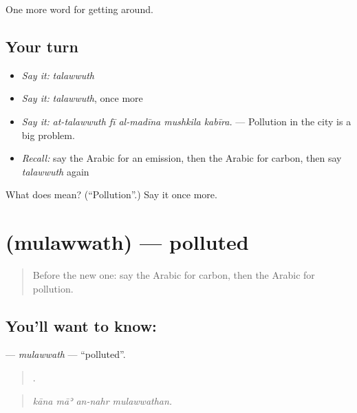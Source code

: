 \begin{grammarlens}[title={What you've built}]
One more word for getting around.
\end{grammarlens}

\subsection*{Your turn}
\begin{itemize}
\raggedright
  \item \emph{Say it:} \emph{talawwuth}
  \item \emph{Say it:} \emph{talawwuth}, once more
  \item \emph{Say it:} \emph{at-talawwuth fī al-madīna mushkila kabīra.} — Pollution in the city is a big problem.
  \item \emph{Recall:} say the Arabic for an emission, then the Arabic for carbon, then say \emph{talawwuth} again
\end{itemize}

\begin{tcolorbox}[breakable,colback=teal!4,colframe=teal!35!black,title={Before you move on}]
What does  mean? (\textquotedblleft{}Pollution\textquotedblright{}.) Say it once more.
\end{tcolorbox}
\section[\texorpdfstring{\ar{ملوث} (mulawwath)}{ملوث (mulawwath)}]{ (mulawwath) — polluted}

\label{lesson:AR-C464-mulawwath}



\begin{quote}
Before the new one: say the Arabic for carbon, then the Arabic for pollution.
\end{quote}

\subsection*{You'll want to know: }
\textbf{} — \emph{mulawwath} — \textquotedblleft{}polluted\textquotedblright{}.

\begin{quote}
   .
\end{quote}

\begin{quote}
\emph{kāna māʾ an-nahr mulawwathan.}
\end{quote}

